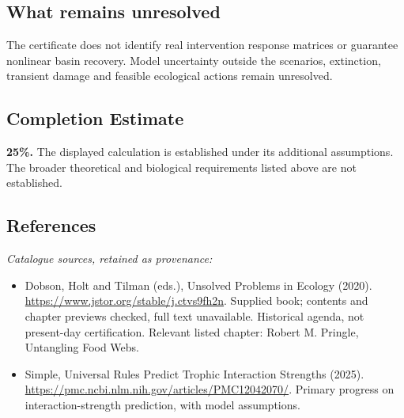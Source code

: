 \documentclass[11pt]{article}
\begin{document}
\subsection{What remains unresolved}
The certificate does not identify real intervention response matrices or guarantee nonlinear basin recovery. Model uncertainty outside the scenarios, extinction, transient damage and feasible ecological actions remain unresolved.
\subsection{Completion Estimate}
\textbf{25\%.} The displayed calculation is established under its additional assumptions. The broader theoretical and biological requirements listed above are not established.
\subsection{References}
\noindent\emph{Catalogue sources, retained as provenance:}
\begin{itemize}
\item Dobson, Holt and Tilman (eds.), Unsolved Problems in Ecology (2020). \url{https://www.jstor.org/stable/j.ctvs9fh2n}. Supplied book; contents and chapter previews checked, full text unavailable. Historical agenda, not present-day certification. Relevant listed chapter: Robert M. Pringle, Untangling Food Webs.
\item Simple, Universal Rules Predict Trophic Interaction Strengths (2025). \url{https://pmc.ncbi.nlm.nih.gov/articles/PMC12042070/}. Primary progress on interaction-strength prediction, with model assumptions.
\end{itemize}
\end{document}
